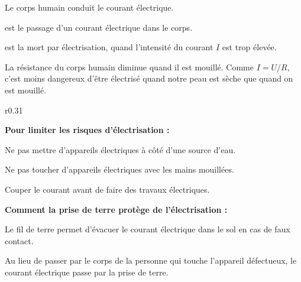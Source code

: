 
\pointCyan Le corps humain conduit le courant électrique.

\pointCyan {} est le passage d'un courant électrique dans le corps.

\pointCyan {} est la mort par électrisation, quand l'intensité du courant $I$ est trop élevée.

\pointCyan La résistance du corps humain diminue quand il est mouillé.
Comme $I = U / R$, c'est moins dangereux d'être électrisé quand notre peau est sèche que quand on est mouillé.

\medskip
\begin{wrapfigure}[3]{r}{0.31\linewidth}
  \centering
\end{wrapfigure}

\textbf{Pour limiter les risques d'électrisation :}
\begin{listePoints}
  \item Ne pas mettre d'appareils électriques à côté d'une source d'eau.
  \item Ne pas toucher d'appareils électriques avec les mains mouillées.
  \item Couper le courant avant de faire des travaux électriques.
\end{listePoints}

\medskip
\textbf{Comment la prise de terre protège de l'électrisation :}

\begin{importants}
  Le fil de terre permet d'évacuer le courant électrique dans le sol en cas de faux contact.
  
  Au lieu de passer par le corps de la personne qui touche l'appareil défectueux, le courant électrique passe par la prise de terre.
\end{importants}

